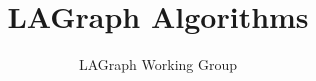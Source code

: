 \documentclass{article}
\begin{document}
\title{LAGraph Algorithms}

\author{LAGraph Working Group}

\maketitle

\begin{abstract}

\end{abstract}








\clearpage



\end{document}
